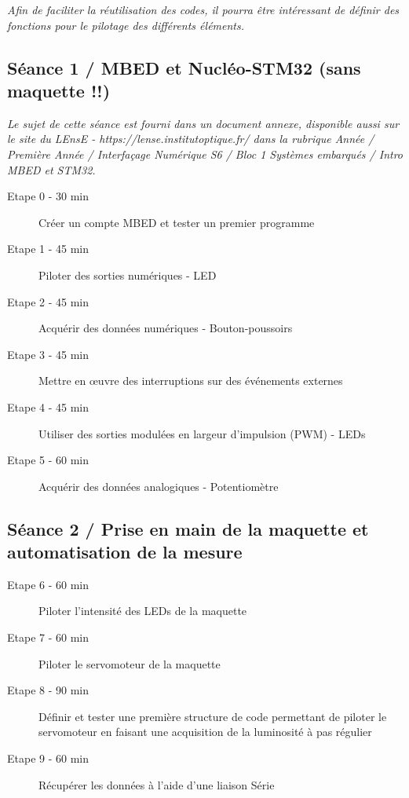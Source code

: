 \documentclass[a4paper,11pt,titlepage]{article} %
\begin{document}
\textit{Afin de faciliter la réutilisation des codes, il pourra être intéressant de définir des fonctions pour le pilotage des différents éléments.}

\subsection{Séance 1 / MBED et Nucléo-STM32 (sans maquette !!)}

\textit{Le sujet de cette séance est fourni dans un document annexe, disponible aussi sur le site du LEnsE - https://lense.institutoptique.fr/ dans la rubrique Année / Première Année / Interfaçage Numérique S6 / Bloc 1 Systèmes embarqués / Intro MBED et STM32.}

	\begin{description}
		\item[Etape 0 - 30 min] Créer un compte MBED et tester un premier programme
		\item[Etape 1 - 45 min] Piloter des sorties numériques - LED
		\item[Etape 2 - 45 min] Acquérir des données numériques - Bouton-poussoirs
		\item[Etape 3 - 45 min] Mettre en \oe{}uvre des interruptions sur des événements externes
		\item[Etape 4 - 45 min] Utiliser des sorties modulées en largeur d'impulsion (PWM) - LEDs
		\item[Etape 5 - 60 min] Acquérir des données analogiques - Potentiomètre
	\end{description}	

\subsection{Séance 2 / Prise en main de la maquette et automatisation de la mesure}

	\begin{description}
		\item[Etape 6 - 60 min] Piloter l'intensité des LEDs de la maquette
		\item[Etape 7 - 60 min] Piloter le servomoteur de la maquette
		\item[Etape 8 - 90 min] Définir et tester une première structure de code permettant de piloter le servomoteur en faisant une acquisition de la luminosité à pas régulier
		\item[Etape 9 - 60 min] Récupérer les données à l'aide d'une liaison Série
	\end{description}
	
\end{document}
